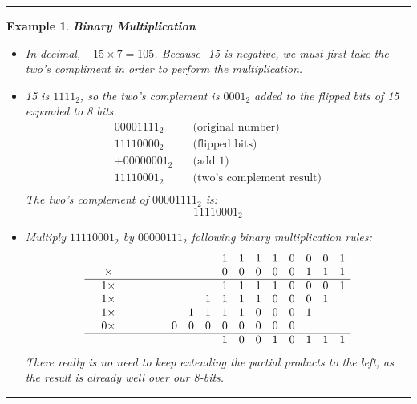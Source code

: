 \documentclass[12pt]{article}
\newtheorem{example}{Example}
\newenvironment{examp}
{\vspace{0.5cm}
 \hrule
\vspace{0.5cm}
\begin{example}}
{\hrule
\vspace{0.5cm}
\end{example}}
\begin{document}
\begin{examp}
	\textbf{Binary Multiplication}
	\begin{itemize}
		\item In decimal, \(-15 \times 7 = 105\).
		      Because -15 is negative, we must first take the two's compliment in order to perform the multiplication.
		\item 15 is \(1111_2\), so the two's complement is \(0001_2\) added to the flipped bits of 15 expanded to 8 bits.
		      \[
			      \begin{aligned}
				      00001111_2   & \quad \text{(original number)}         \\
				      \hline
				      11110000_2   & \quad \text{(flipped bits)}            \\
				      + 00000001_2 & \quad \text{(add 1)}                   \\
				      \hline
				      11110001_2   & \quad \text{(two's complement result)} \\
			      \end{aligned}
		      \]
		      The two's complement of \(00001111_2\) is:
		      \[
			      11110001_2
		      \]
		\item Multiply \(11110001_2\) by \(00000111_2\) following binary multiplication rules:
		      \[
			      \begin{array}{c c c c c c c c c c c c c c c c c }
				       &          &  &  &  &  &   &   &   & 1 & 1 & 1 & 1 & 0 & 0 & 0 & 1 \\
				       & \times   &  &  &  &  &   &   &   & 0 & 0 & 0 & 0 & 0 & 1 & 1 & 1 \\
				      \hline

				       & 1 \times &  &  &  &  &   &   &   & 1 & 1 & 1 & 1 & 0 & 0 & 0 & 1 \\

				       & 1 \times &  &  &  &  &   &   & 1 & 1 & 1 & 1 & 0 & 0 & 0 & 1 &   \\
				       & 1 \times &  &  &  &  &   & 1 & 1 & 1 & 1 & 0 & 0 & 0 & 1 &   &   \\
				       & 0 \times &  &  &  &  & 0 & 0 & 0 & 0 & 0 & 0 & 0 & 0 &   &   &   \\
				      \hline
				       &          &  &  &  &  &   &   &   & 1 & 0 & 0 & 1 & 0 & 1 & 1 & 1 \\
			      \end{array}
		      \]
		      There really is no need to keep extending the partial products to the left, as the result is already well over our 8-bits.


\end{itemize}
\end{examp}
\end{document}
